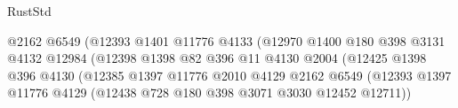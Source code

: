 \begin{lexlean}{RustStd}
\begin{coremodule}
                                                @2162
                                                @6549
                                                (@12393
                                                  @1401
                                                  @11776
                                                  @4133
                                                  (@12970
                                                    @1400
                                                    @180
                                                    @398
                                                    @3131
                                                    @4132
                                                    @12984
                                                    (@12398
                                                      @1398
                                                      @82
                                                      @396
                                                      @11
                                                      @4130
                                                      @2004
                                                      (@12425
                                                        @1398
                                                        @396
                                                        @4130
                                                        (@12385
                                                          @1397
                                                          @11776
                                                          @2010
                                                          @4129
                                                          @2162
                                                          @6549
                                                          (@12393
                                                            @1397
                                                            @11776
                                                            @4129
                                                            (@12438
                                                              @728
                                                              @180
                                                              @398
                                                              @3071
                                                              @3030
                                                              @12452
                                                              @12711))

\end{coremodule}
\end{lexlean}
